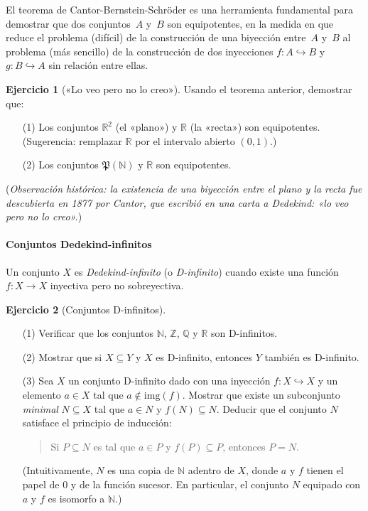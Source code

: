 \documentclass[a4paper,12pt]{book}
\newcommand{\N}{\mathbb{N}}
\newcommand{\R}{\mathbb{R}}
\def\Pow{\mathfrak{P}}
\def\img{\mathrm{img}}
\def\into{\hookrightarrow}
\def\Pow{\mathfrak{P}}
\def\img{\mathrm{img}}
\def\into{\hookrightarrow}
\def\Z{\mathbb{Z}}
\def\Q{\mathbb{Q}}
\theoremstyle{definition}
\newtheorem{ejercicio}{Ejercicio}
\begin{document}
	El teorema de Cantor-Bernstein-Schröder es una herramienta
	fundamental para demostrar que dos conjuntos~$A$ y~$B$ son
	equipotentes, en la medida en que reduce el problema (difícil) de la
	construcción de una biyección entre~$A$ y~$B$ al problema (más
	sencillo) de la construcción de dos inyecciones $f:A\into B$ y
	$g:B\into A$ sin relación entre ellas.
	
	\begin{ejercicio}[«Lo veo pero no lo creo»]
		Usando el teorema anterior, demostrar que:
		\begin{enumerate}
			\item[(1)] Los conjuntos $\R^2$ (el «plano») y $\R$ (la «recta»)
			son equipotentes.\\
			(Sugerencia: remplazar $\R$ por el intervalo abierto $(0,1)$.)
			\item[(2)] Los conjuntos $\Pow(\N)$ y $\R$ son equipotentes.
		\end{enumerate}
		(\emph{Observación histórica: la existencia de una biyección entre
			el plano y la recta fue descubierta en 1877 por Cantor, que
			escribió en una carta a Dedekind: «lo veo pero no lo creo».})
	\end{ejercicio}
	
	\paragraph*{Conjuntos Dedekind-infinitos}
	Un conjunto $X$ es \emph{Dedekind-infinito} (o \emph{D-infinito})
	cuando existe una función $f:X\to X$ inyectiva pero no sobreyectiva.
	
	\begin{ejercicio}[Conjuntos D-infinitos]~\par
		\begin{enumerate}
			\item[(1)] Verificar que los conjuntos $\N$, $\Z$, $\Q$ y $\R$ son
			D-infinitos.
			\item[(2)] Mostrar que si $X\subseteq Y$ y $X$ es D-infinito,
			entonces $Y$ también es D-infinito.
			\item[(3)] Sea $X$ un conjunto D-infinito dado con una inyección
			$f:X\into X$ y un elemento $a\in X$ tal que $a\notin\img(f)$.
			Mostrar que existe un subconjunto \emph{minimal} $N\subseteq X$
			tal que $a\in N$ y $f(N)\subseteq N$.
			Deducir que el conjunto $N$ satisface el principio de inducción:
			\begin{quote}
				Si $P\subseteq N$ es tal que $a\in P$ y
				$f(P)\subseteq P$, entonces $P=N$.
			\end{quote}
			(Intuitivamente, $N$ es una copia de $\N$ adentro de $X$, donde
			$a$ y $f$ tienen el papel de $0$ y de la función sucesor.
			En particular, el conjunto $N$ equipado con $a$ y $f$ es isomorfo
			a $\N$.)
		\end{enumerate}
	\end{ejercicio}
	
\end{document}
